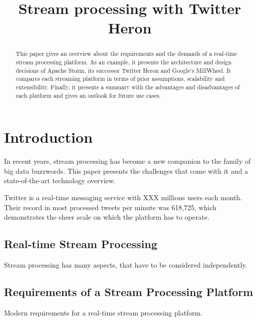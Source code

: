 \documentclass[conference]{IEEEtran}
\begin{document}
\title{Stream processing with Twitter Heron}

\author{
}

\maketitle

\begin{abstract}
This paper gives an overview about the requirements and the demands of a real-time stream processing platform.
As an example, it presents the architecture and design decisions of Apache Storm, its successor Twitter Heron and Google`s MillWheel. %
It compares each streaming platform in terms of prior assumptions, scalability and extensibility.
Finally, it presents a summary with the advantages and disadvantages of each platform and gives an outlook for future use cases.

\end{abstract}

\section{Introduction}

In recent years, stream processing has become a new companion to the family of big data buzzwords.
This paper presents the challenges that come with it and a state-of-the-art technology overview.

Twitter is a real-time messaging service with XXX millions users each month.
Their record in most processed tweets per minute was 618,725, which demonstrates the sheer scale on which the platform has to operate.

\subsection{Real-time Stream Processing}

Stream processing has many aspects, that have to be considered independently.

\subsection{Requirements of a Stream Processing Platform}

Modern requirements for a real-time stream processing platform.
\end{document}
